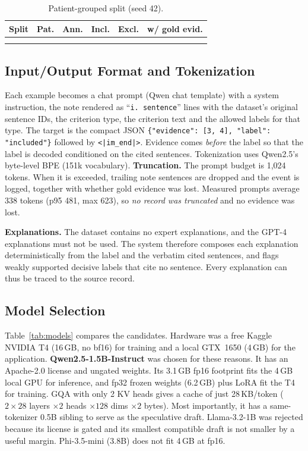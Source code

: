 \documentclass[conference]{IEEEtran}
\newcommand{\tbl}[1]{\IfFileExists{tables/#1}{}{\multicolumn{3}{l}{(pending: #1)}\\}}
\begin{document}
\begin{table}[t]\centering\caption{Patient-grouped split (seed 42).}\label{tab:split}
\begin{tabular}{lrrrrr}\toprule
Split & Pat. & Ann. & Incl. & Excl. & w/ gold evid.\\\midrule
\tbl{split.tex}
\bottomrule\end{tabular}\end{table}

\subsection{Input/Output Format and Tokenization}
Each example becomes a chat prompt (Qwen chat template) with a system instruction, the note
rendered as ``\texttt{i. sentence}'' lines with the dataset's original sentence IDs, the
criterion type, the criterion text and the allowed labels for that type. The target is the
compact JSON \texttt{\{"evidence": [3, 4], "label": "included"\}} followed by
\texttt{<|im\_end|>}. Evidence comes \emph{before} the label so that the label is decoded
conditioned on the cited sentences. Tokenization uses Qwen2.5's byte-level BPE (151k vocabulary).
\textbf{Truncation.} The prompt budget is 1,024 tokens. When it is exceeded, trailing note sentences are
dropped and the event is logged, together with whether gold evidence was lost. Measured prompts
average 338 tokens (p95 481, max 623), so \emph{no record was truncated} and no evidence was lost.

\textbf{Explanations.} The dataset contains no expert explanations, and the GPT-4 explanations
must not be used. The system therefore composes each explanation deterministically from the label and
the verbatim cited sentences, and flags weakly supported decisive labels that cite no sentence. Every
explanation can thus be traced to the source record.

\subsection{Model Selection}
Table~\ref{tab:models} compares the candidates. Hardware was a free Kaggle NVIDIA T4 (16\,GB, no bf16)
for training and a local GTX~1650 (4\,GB) for the application. \textbf{Qwen2.5-1.5B-Instruct} was chosen
for these reasons. It has an Apache-2.0 license and ungated weights. Its 3.1\,GB fp16 footprint fits
the 4\,GB local GPU for inference, and fp32 frozen weights (6.2\,GB) plus LoRA fit the T4 for training.
GQA with only 2 KV heads gives a cache of just 28\,KB/token ($2\times28$ layers $\times2$ heads
$\times128$ dims $\times2$ bytes). Most importantly, it has a same-tokenizer 0.5B sibling to serve as
the speculative draft. Llama-3.2-1B was rejected because its license is gated and its smallest
compatible draft is not smaller by a useful margin. Phi-3.5-mini (3.8B) does not fit 4\,GB at fp16.
\end{document}

